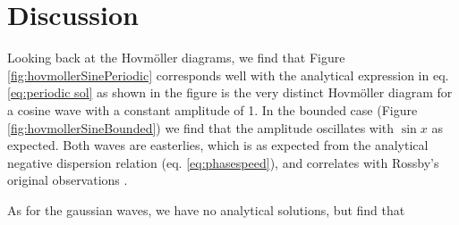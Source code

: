 \section{Discussion}
\label{sec:discussion}

Looking back at the Hovmöller diagrams, we find that Figure \ref{fig:hovmollerSinePeriodic} corresponds well with the analytical expression in eq. \ref{eq:periodic sol} as shown in the figure is the very distinct Hovmöller diagram for a cosine wave with a constant amplitude of 1. In the bounded case (Figure \ref{fig:hovmollerSineBounded}) we find that the amplitude oscillates with $\sin{x}$ as expected. Both waves are easterlies, which is as expected from the analytical negative dispersion relation (eq. \ref{eq:phasespeed}), and correlates with Rossby's original observations \citep{rossby}.

As for the gaussian waves, we have no analytical solutions, but find that 